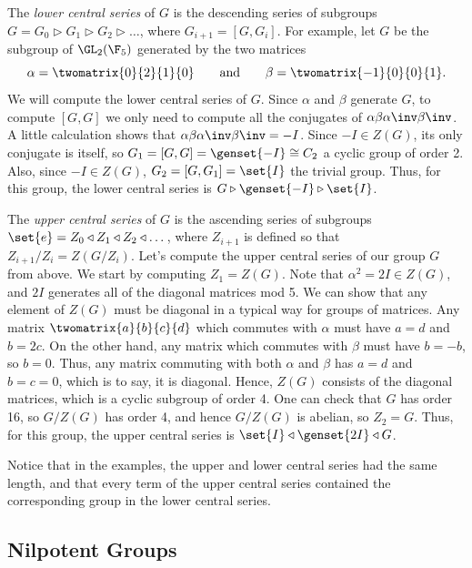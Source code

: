 The \emph{lower central series} of $G$ is the descending series of subgroups $G = G_0 \triangleright G_1 \triangleright G_2 \triangleright \dots$, where $G_{i+1} = [G,G_i]$. For example, let $G$ be the subgroup of $\GL_2(\F_5)$ generated by the two matrices
\[\alpha = \twomatrix{0}{2}{1}{0} \qquad \text{and} \qquad \beta = \twomatrix{-1}{0}{0}{1}.\]
We will compute the lower central series of $G$. Since $\alpha$ and $\beta$ generate $G$, to compute $[G,G]$ we only need to compute all the conjugates of $\alpha \beta \alpha\inv \beta\inv$. A little calculation shows that $\alpha \beta \alpha\inv \beta\inv = -I$. Since $-I \in Z(G)$, its only conjugate is itself, so $G_1 = [G,G] = \genset{-I} \cong C_2$ a cyclic group of order 2. Also, since $-I \in Z(G)$, $G_2 = [G,G_1] = \set{I}$ the trivial group. Thus, for this group, the lower central series is $G \triangleright \genset{-I} \triangleright \set{I}$.

The \emph{upper central series} of $G$ is the ascending series of subgroups $\set{e} = Z_0 \triangleleft Z_1 \triangleleft Z_2 \triangleleft \dots$, where $Z_{i+1}$ is defined so that $Z_{i+1}/Z_i = Z(G/Z_i)$. Let's compute the upper central series of our group $G$ from above. We start by computing $Z_1 = Z(G)$. Note that $\alpha^2 = 2I \in Z(G)$, and $2I$ generates all of the diagonal matrices mod 5. We can show that any element of $Z(G)$ must be diagonal in a typical way for groups of matrices. Any matrix $\twomatrix{a}{b}{c}{d}$ which commutes with $\alpha$ must have $a = d$ and $b = 2c$. On the other hand, any matrix which commutes with $\beta$ must have $b = -b$, so $b = 0$. Thus, any matrix commuting with both $\alpha$ and $\beta$ has $a = d$ and $b = c = 0$, which is to say, it is diagonal. Hence, $Z(G)$ consists of the diagonal matrices, which is a cyclic subgroup of order 4. One can check that $G$ has order 16, so $G/Z(G)$ has order 4, and hence $G/Z(G)$ is abelian, so $Z_2 = G$. Thus, for this group, the upper central series is $\set{I} \triangleleft \genset{2I} \triangleleft G$.

Notice that in the examples, the upper and lower central series had the same length, and that every term of the upper central series contained the corresponding group in the lower central series.

\subsection*{Nilpotent Groups}

